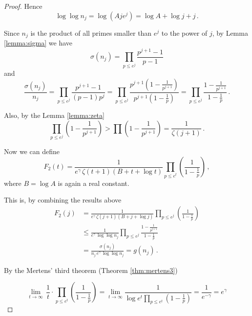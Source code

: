 \documentclass{article}
\begin{document}
\begin{theorem}
\begin{proof}
Hence
\begin{equation*}
\label{eq:lognj}
    \log \log n_j = \log (Aje^j) = \log A + \log j + j\,.
\end{equation*}

Since $n_j$ is the product of all primes smaller than $e^j$ to the power of $j$, by Lemma \ref{lemma:sigma} we have
\begin{equation*}
    \sigma(n_j) = \prod_{p\leq e^j} \frac{p^{j+1}-1}{p-1}
\end{equation*}
and
\begin{equation*}
    \frac{\sigma(n_j)}{n_j} = \prod_{p\leq e^j} \frac{p^{j+1}-1}{(p-1)p^j} = \prod_{p\leq e^j} \frac{p^{j+1}\left(1-\frac{1}{p^{j+1}}\right)}{p^{j+1}\left(1-\frac{1}{p}\right)} = \prod_{p\leq e^j} \frac{1-\frac{1}{p^{j+1}}}{1-\frac{1}{p}}\,.
\end{equation*}

Also, by the Lemma \ref{lemma:zeta}
\begin{equation*}
    \prod_{p\leq e^j}\left(1-\frac{1}{p^{j+1}}\right) > \prod \left(1-\frac{1}{p^{j+1}}\right) = \frac{1}{\zeta(j+1)}\,.
\end{equation*}

Now we can define
\begin{equation*}
    F_2(t)=\frac{1}{e^\gamma\,\zeta(t+1)(B+t+\log t)} \prod_{p\leq e^t} \left(\frac{1}{1-\frac{1}{p}}\right)\,,
\end{equation*}
where $B=\log A$ is again a real constant.

This is, by combining the results above
\begin{align*}
    F_2(j)& = \frac{1}{e^\gamma\,\zeta(j+1)(B+j+\log j)} \prod_{p\leq e^j} \left(\frac{1}{1-\frac{1}{p}}\right)\\
    & \leq \frac{1}{e^\gamma\,\log \log n_j} \prod_{p\leq e^j} \frac{1-\frac{1}{p^{j+1}}}{1-\frac{1}{p}}\\
    & = \frac{\sigma(n_j)}{n_j\,e^\gamma\,\log \log n_j} = g(n_j)\,.
\end{align*}

By the Mertens' third theorem (Theorem \ref{thm:mertens3})

\begin{equation*}
    \lim_{t \rightarrow \infty}\, \frac{1}{t} \cdot \prod_{p\leq e^t} \left(\frac{1}{1-\frac{1}{p}}\right) = \lim_{t \rightarrow \infty} \frac{1}{\log e^t\prod_{p\leq e^t} \left(1-\frac{1}{p}\right)} = \frac{1}{e^{-\gamma}} = e^\gamma
\end{equation*}


\end{proof}
\end{theorem}
\end{document}
